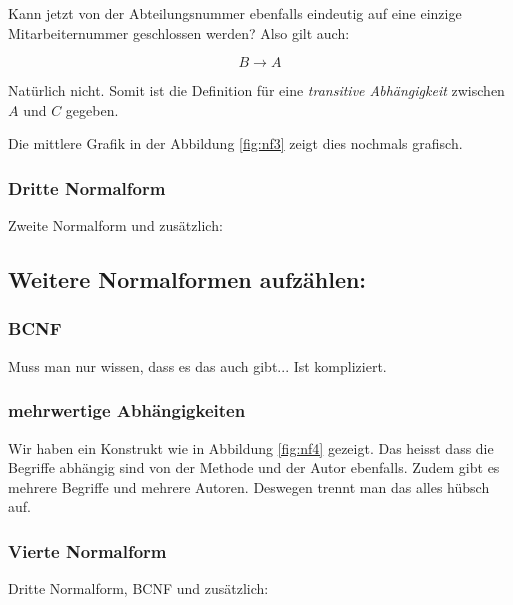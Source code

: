 Kann jetzt von der Abteilungsnummer ebenfalls eindeutig auf eine einzige Mitarbeiternummer geschlossen werden? Also gilt auch:

\begin{equation*}
    B\rightarrow A
\end{equation*}

Natürlich nicht. Somit ist die Definition für eine \emph{transitive Abhängigkeit} zwischen \(A\) und \(C\) gegeben.

Die mittlere Grafik in der Abbildung \ref{fig:nf3} zeigt dies nochmals grafisch.

\subsubsection{Dritte Normalform}
Zweite Normalform und zusätzlich:

\begin{center}
\end{center}

\subsection{Weitere Normalformen aufzählen:}

\subsubsection{BCNF}
Muss man nur wissen, dass es das auch gibt... Ist kompliziert.

\subsubsection{mehrwertige Abhängigkeiten}


Wir haben ein Konstrukt wie in Abbildung \ref{fig:nf4} gezeigt. Das heisst dass die Begriffe abhängig sind von der Methode und der Autor ebenfalls. Zudem gibt es mehrere Begriffe und mehrere Autoren. Deswegen trennt man das alles hübsch auf.

\subsubsection{Vierte Normalform}

Dritte Normalform, BCNF und zusätzlich:

